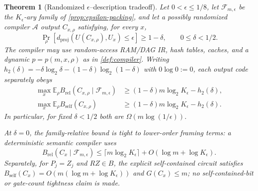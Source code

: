 \documentclass[aps,prx,reprint,floatfix,superscriptaddress]{revtex4-2}
\newtheorem{theorem}{Theorem}
\begin{document}
\begin{theorem}[Randomized $\epsilon$--description tradeoff]
\label{thm:output-counting}
Let $0<\epsilon\leq1/8$, let $\mathcal F_{m,\epsilon}$ be the
$K_\epsilon$-ary family of \cref{prop:epsilon-packing}, and let a possibly
randomized compiler $\mathcal A$ output $C_{x,\rho}$ satisfying, for every
$x$,
\begin{equation}\label{eq:random-success}
 \Pr_\rho\!\left[
 d_{\mathrm{proj}}(U(C_{x,\rho}),U_x)\leq\epsilon
 \right]\geq1-\delta,
 \qquad 0\leq\delta<1/2.
\end{equation}
The compiler may use random-access RAM/DAG IR, hash tables, caches, and a
dynamic $p=p(m,x,\rho)$ as in \cref{def:compiler}.  Writing
$h_2(\delta)=-\delta\log_2\delta-(1-\delta)\log_2(1-\delta)$ with
$0\log 0:=0$, each output
code separately obeys
\begin{equation}\label{eq:output-counting}
\begin{aligned}
 \max_x\mathbb E_\rho
 B_{\mathrm{rel}}(C_{x,\rho}\mid\mathcal F_{m,\epsilon})
 &\geq(1-\delta)m\log_2K_\epsilon-h_2(\delta),\\
 \max_x\mathbb E_\rho B_{\mathrm{self}}(C_{x,\rho})
 &\geq(1-\delta)m\log_2K_\epsilon-h_2(\delta).
\end{aligned}
\end{equation}
In particular, for fixed $\delta<1/2$ both are
$\Omega(m\log(1/\epsilon))$.

At $\delta=0$, the family-relative bound is tight to lower-order framing
terms: a deterministic semantic compiler uses
\begin{equation}\label{eq:relative-epsilon-upper}
 B_{\mathrm{rel}}(C_x\mid\mathcal F_{m,\epsilon})
 \leq\lceil m\log_2K_\epsilon\rceil
       +O(\log m+\log K_\epsilon).
\end{equation}
Separately, for $P_j=Z_j$ and $RZ\in B$, the explicit self-contained
circuit satisfies
$B_{\mathrm{self}}(C_x)=O(m(\log m+\log K_\epsilon))$ and $G(C_x)\leq m$;
no self-contained-bit or gate-count tightness claim is made.
\end{theorem}
\end{document}

